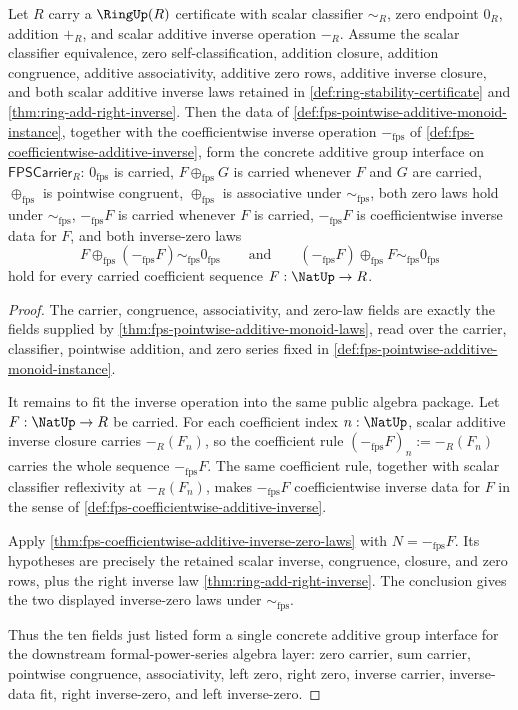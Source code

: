 \begin{theorem}
\label{thm:fps-pointwise-additive-group-laws}
Let $R$ carry a $\RingUp(R)$ certificate with scalar classifier $\sim_R$, zero endpoint $0_R$, addition $+_R$, and scalar additive inverse operation $-_R$. Assume the scalar classifier equivalence, zero self-classification, addition closure, addition congruence, additive associativity, additive zero rows, additive inverse closure, and both scalar additive inverse laws retained in \autoref{def:ring-stability-certificate} and \autoref{thm:ring-add-right-inverse}. Then the data of \autoref{def:fps-pointwise-additive-monoid-instance}, together with the coefficientwise inverse operation $-_{\mathrm{fps}}$ of \autoref{def:fps-coefficientwise-additive-inverse}, form the concrete additive group interface on $\mathsf{FPSCarrier}_R$: $0_{\mathrm{fps}}$ is carried, $F\oplus_{\mathrm{fps}}G$ is carried whenever $F$ and $G$ are carried, $\oplus_{\mathrm{fps}}$ is pointwise congruent, $\oplus_{\mathrm{fps}}$ is associative under $\sim_{\mathrm{fps}}$, both zero laws hold under $\sim_{\mathrm{fps}}$, $-_{\mathrm{fps}}F$ is carried whenever $F$ is carried, $-_{\mathrm{fps}}F$ is coefficientwise inverse data for $F$, and both inverse-zero laws
$$
F\oplus_{\mathrm{fps}}(-_{\mathrm{fps}}F)\sim_{\mathrm{fps}}0_{\mathrm{fps}}
\qquad\text{and}\qquad
(-_{\mathrm{fps}}F)\oplus_{\mathrm{fps}}F\sim_{\mathrm{fps}}0_{\mathrm{fps}}
$$
hold for every carried coefficient sequence $F:\NatUp\to R$.
\end{theorem}
\begin{proof}
The carrier, congruence, associativity, and zero-law fields are exactly the fields supplied by \autoref{thm:fps-pointwise-additive-monoid-laws}, read over the carrier, classifier, pointwise addition, and zero series fixed in \autoref{def:fps-pointwise-additive-monoid-instance}.

It remains to fit the inverse operation into the same public algebra package. Let $F:\NatUp\to R$ be carried. For each coefficient index $n:\NatUp$, scalar additive inverse closure carries $-_R(F_n)$, so the coefficient rule $(-_{\mathrm{fps}}F)_n:= -_R(F_n)$ carries the whole sequence $-_{\mathrm{fps}}F$. The same coefficient rule, together with scalar classifier reflexivity at $-_R(F_n)$, makes $-_{\mathrm{fps}}F$ coefficientwise inverse data for $F$ in the sense of \autoref{def:fps-coefficientwise-additive-inverse}.

Apply \autoref{thm:fps-coefficientwise-additive-inverse-zero-laws} with $N=-_{\mathrm{fps}}F$. Its hypotheses are precisely the retained scalar inverse, congruence, closure, and zero rows, plus the right inverse law \autoref{thm:ring-add-right-inverse}. The conclusion gives the two displayed inverse-zero laws under $\sim_{\mathrm{fps}}$.

Thus the ten fields just listed form a single concrete additive group interface for the downstream formal-power-series algebra layer: zero carrier, sum carrier, pointwise congruence, associativity, left zero, right zero, inverse carrier, inverse-data fit, right inverse-zero, and left inverse-zero.
\end{proof}

